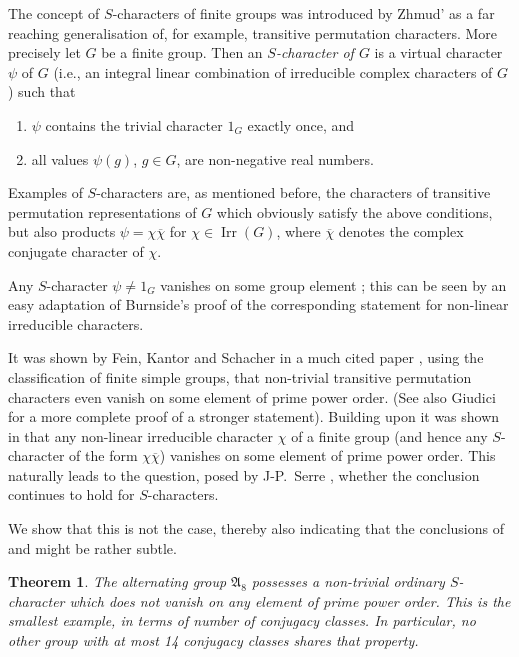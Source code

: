 \documentclass[12pt,leqno,a4paper]{amsart}
\newcommand{\fA}{{\mathfrak{A}}} %
\newcommand{\Irr}{{\operatorname{Irr}}}
\newtheorem{thm}{Theorem}
\theoremstyle{definition}
\begin{document}
The concept of $S$-characters of finite groups was introduced by Zhmud' \cite{Zh}
as a far reaching generalisation of, for example, transitive permutation
characters. More precisely let $G$ be a finite group. Then an
\emph{$S$-character of $G$} is a virtual character $\psi$ of $G$ (i.e., an
integral linear combination of irreducible complex characters of $G$) such that
\begin{enumerate}
\item $\psi$ contains the trivial character $1_G$ exactly once, and
\item all values $\psi(g)$, $g\in G$, are non-negative real numbers.
\end{enumerate}
Examples of $S$-characters are, as mentioned before, the characters of transitive
permutation representations of $G$ which obviously satisfy the above conditions,
but also products $\psi=\chi\overline{\chi}$ for $\chi\in\Irr(G)$, where
$\overline{\chi}$ denotes the complex conjugate character of $\chi$.

Any $S$-character $\psi\ne 1_G$ vanishes on some group element \cite[Thm~1]{Zh};
this can be seen by an easy adaptation of Burnside's proof of the corresponding
statement for non-linear irreducible characters.

It was shown by Fein, Kantor and Schacher in a much cited paper \cite{FKS},
using the classification of finite simple groups, that non-trivial transitive
permutation characters even vanish on some element of prime power order. (See
also Giudici \cite{Giu} for a more complete proof of a stronger statement).
Building upon \cite{FKS} it was shown in \cite{MNO} that any non-linear
irreducible character $\chi$ of a finite group (and hence any $S$-character of
the form $\chi\overline{\chi}$) vanishes on some element of prime power order.
This naturally leads to the question, posed by J-P.~Serre \cite{Se}, whether
the conclusion continues to hold for $S$-characters.

We show that this is not the case, thereby also indicating that the conclusions
of \cite{FKS} and \cite{MNO} might be rather subtle.

\begin{thm}   \label{thm}
  The alternating group $\fA_8$ possesses a non-trivial ordinary $S$-character
  which does not vanish on any element of prime power order.
  This is the smallest example, in terms of number of conjugacy classes.
  In particular, no other group with at most 14 conjugacy classes shares that
  property.
\end{thm}
\end{document}
